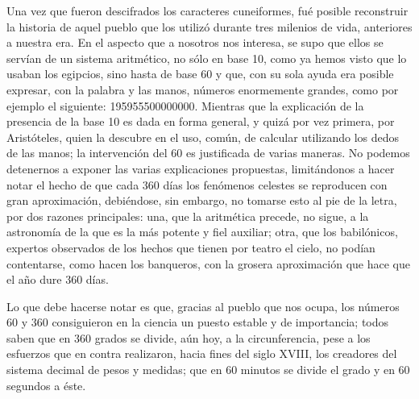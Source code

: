 \documentclass[a4paper, 12pt, draft]{article}
\begin{document}
Una vez que fueron descifrados los caracteres cuneiformes, fué posible reconstruir la historia de aquel pueblo que los utilizó durante tres milenios de vida, anteriores a nuestra era. En el aspecto que a nosotros nos interesa, se supo que ellos se servían de un sistema aritmético, no sólo en base 10, como ya hemos visto que lo usaban los egipcios, sino hasta de base 60 y que, con su sola ayuda era posible expresar, con la palabra y las manos, números enormemente grandes, como por ejemplo el siguiente: 195955500000000. Mientras que la explicación de la presencia de la base 10 es dada en forma general, y quizá por vez primera, por Aristóteles, quien la descubre en el uso, común, de calcular utilizando los dedos de las manos; la intervención del 60 es justificada de varias maneras. No podemos detenernos a exponer las varias explicaciones propuestas, limitándonos a hacer notar el hecho de que cada 360 días los fenómenos celestes se reproducen con gran aproximación, debiéndose, sin embargo, no tomarse esto al pie de la letra, por dos razones principales: una, que la aritmética precede, no sigue, a la astronomía de la que es la más potente y fiel auxiliar; otra, que los babilónicos, expertos observados de los hechos que tienen por teatro el cielo, no podían contentarse, como hacen los banqueros, con la grosera aproximación que hace que el año dure 360 días.

Lo que debe hacerse notar es que, gracias al pueblo que nos ocupa, los números 60 y 360 consiguieron en la ciencia un puesto estable y de importancia; todos saben que en 360 grados se divide, aún hoy, a la circunferencia, pese a los esfuerzos que en contra realizaron, hacia fines del siglo XVIII, los creadores del sistema decimal de pesos y medidas; que en 60 minutos se divide el grado y en 60 segundos a éste.
\end{document}
